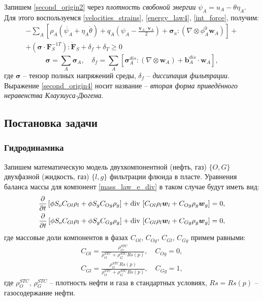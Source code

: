 	Запишем \eqref{second_origin2} через \textit{плотность свобоной энергии} $\psi_A = u_A - \theta \eta_A$. Для этого воспользуемся \eqref{velocities_strains}, \eqref{energy_law4}, \eqref{int_force}, получим:
\begin{multline}
	\label{second_origin3}
	-\sum\limits_{A} \left[\rho_A \left(\dot{\psi_A} + \eta_A\dot{\theta}\right) + q_A\left(\psi_A - \frac{\boldsymbol{v}_A\cdot \boldsymbol{v}_A}{2}\right) + \boldsymbol{\sigma}_a :\left(\nabla \otimes \phi_A^0 \boldsymbol{w}_A\right)\right]+\\
	+\left(\boldsymbol{\sigma} \cdot \boldsymbol{F}_S^{-1T}\right) : \dot{\boldsymbol{F}}_S + \delta_f + \delta_T \geq 0
\end{multline}
\begin{equation}
	\label{second_origin4}
	\boldsymbol{\sigma} = \sum_A \boldsymbol{\sigma}_A, 
	\quad \delta_f = \sum_A\left[\boldsymbol{\sigma}_A^{dis}:\left(\nabla \otimes \boldsymbol{w}_A\right)+\boldsymbol{b}_A^{dis} \cdot \boldsymbol{w}_A\right],
\end{equation}
	где $\boldsymbol{\sigma}$ -- тензор полных напряжений среды,
	$\delta_f$ -- \textit{диссипация фильтрации}.
	Выражение \eqref{second_origin4} носит название -- \textit{вторая форма приведённого неравенства Клаузиуса-Дюгема}.
	
\subsection{Постановка задачи}
\subsubsection{Гидродинамика}
	Запишем математическую модель двухкомпонентной (нефть, газ) $\{O, G\}$ двухфазной (жидкость, газ) $\{l, g\}$ фильтрации флюида в пласте.
	Уравнения баланса массы для компонент \eqref{mass_law_e_div} в таком случае будут иметь вид:
\begin{align}
	\label{eqns1}
	\frac{\partial}{\partial{t}}\left[\phi S_oC_{Ol}\rho_l+\phi S_gC_{Og}\rho_g\right]+
	{\rm div}\,\left[C_{Ol}\rho_l\boldsymbol{w}_l+C_{Og}\rho_g\boldsymbol{w}_g\right] = 0,\nonumber\\
	\frac{\partial}{\partial{t}}\left[\phi S_oC_{Gl}\rho_l+\phi S_gC_{Gg}\rho_g\right]+
	{\rm div}\,\left[C_{Gl}\rho_l\boldsymbol{w}_l+C_{Gg}\rho_g\boldsymbol{w}_g\right] = 0,
\end{align}
	где массовые доли компонентов в фазах $C_{Ol}$, $C_{Og}$, $C_{Gl}$, $C_{Gg}$ примем равными:
\begin{align}
	\label{fractions}
	C_{Ol} = \frac{\rho_O^{STC}}{\rho_O^{STC} + \rho_G^{STC}Rs(p)}, \quad C_{Og} = 0,\nonumber\\
	C_{Gl} = \frac{\rho_G^{STC}Rs(p)}{\rho_O^{STC} + \rho_G^{STC}Rs(p)}, \quad C_{Gg} = 1,
\end{align}
	где $\rho_O^{STC}$, $\rho_G^{STC}$ -- плотность нефти и газа в стандартных условиях,
	$Rs = Rs(p)$ -- газосодержание нефти.

